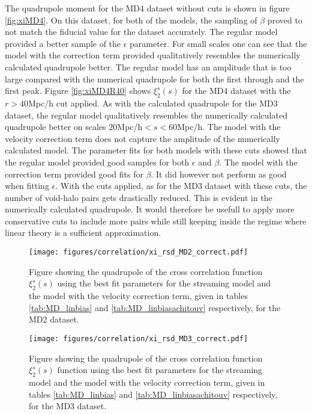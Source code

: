 The quadrupole moment for the MD4 dataset without cuts is shown in figure \ref{fig:xiMD4}. On this dataset, for both of the models, the sampling of $\beta$ proved to not match the fiducial value for the dataset accurately. The regular model provided a better sample of the $\epsilon$ parameter. For small scales one can see that the model with the correction term provided qualitatively resembles the numerically calculated quadrupole better. The regular model has an amplitude that is too large compared with the numerical quadrupole for both the first through and the first peak. Figure \ref{fig:xiMD4R40} shows $\xi_2^s(s)$ for the MD4 dataset with the $r>40$Mpc/h cut applied. As with the calculated quadrupole for the MD3 dataset, the regular model qualitatively resembles the numerically calculated quadrupole better on scales $20$Mpc/h$<s<60$Mpc/h. The model with the velocity correction term does not capture the amplitude of the numerically calculated model. The parameter fits for both models with these cuts showed that the regular model provided good samples for both $\epsilon$ and $\beta$. The model with the correction term provided good fits for $\beta$. It did however not perform as good when fitting $\epsilon$. With the cuts applied, as for the MD3 dataset with these cuts, the number of void-halo pairs gets drastically reduced. This is evident in the numerically calculated quadrupole. It would therefore be usefull to apply more conservative cuts to include more pairs while still keeping inside the regime where linear theory is a sufficient approximation.
\begin{figure}[H]
    \texttt{[image: figures/correlation/xi\_rsd\_MD2\_correct.pdf]}
    \caption{Figure showing the quadrupole of the cross correlation function $\xi_2^s(s)$ using the best fit parameters for the streaming model and the model with the velocity correction term, given in tables \ref{tab:MD_linbias} and \ref{tab:MD_linbiasachitouv} respectively, for the MD2 dataset.}
    \label{fig:xiMD2}
\end{figure}

\begin{figure}[H]
    \texttt{[image: figures/correlation/xi\_rsd\_MD3\_correct.pdf]}
    \caption{Figure showing the quadrupole of the cross correlation function $\xi_2^s(s)$ function using the best fit parameters for the streaming model and the model with the velocity correction term, given in tables \ref{tab:MD_linbias} and \ref{tab:MD_linbiasachitouv} respectively, for the MD3 dataset.}
    \label{fig:xiMD3}
\end{figure}

